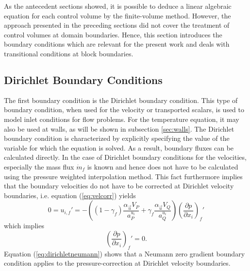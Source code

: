 As the antecedent sections showed, it is possible to deduce a linear algebraic equation for each control volume by the finite-volume method. However, the approach presented in the preceding sections did not cover the treatment of control volumes at domain boundaries. Hence, this section introduces the boundary conditions which are relevant for the present work and deals with transitional conditions at block boundaries.

\subsection{Dirichlet Boundary Conditions}
\label{sec:segDirichlet}

The first boundary condition is the Dirichlet boundary condition. This type of boundary condition, when used for the velocity or transported scalars, is used to model inlet conditions for flow problems. For the temperature equation, it may also be used at walls, as will be shown in subsection \ref{sec:walls}. The Dirichlet boundary condition is characterized by explicitly specifying the value of the variable for which the equation is solved. As a result, boundary fluxes can be calculated directly. In the case of Dirichlet boundary conditions for the velocities, especially the mass flux \(\dot{m}_f\) is known and hence does not have to be calculated using the pressure weighted interpolation method. This fact furthermore implies that the boundary velocities do not have to be corrected at Dirichlet velocity boundaries, i.e. equation (\ref{eq:velcorr}) yields
\begin{displaymath}
  0 
  =
  u_{i,f}' 
  = 
  - \left(\left(1 - \gamma_f\right) \frac{\alpha_\vec{u} V_P}{a_P^{u_i}} + \gamma_f \frac{\alpha_\vec{u} V_Q}{a_Q^{u_i}}\right)
  \left(\frac{\partial p}{\partial x_i}\right)_f'
\end{displaymath}
which implies
\begin{equation}
  \label{eq:dirichletneumann}
  \left(\frac{\partial p}{\partial x_i}\right)_f' = 0.
\end{equation}
Equation (\ref{eq:dirichletneumann}) shows that a Neumann zero gradient boundary condition applies to the pressure-correction at Dirichlet velocity boundaries.

